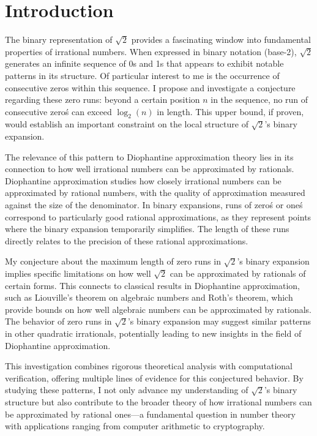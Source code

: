 \section{Introduction}
The binary representation of $\sqrt{2}$ provides a fascinating window into fundamental properties of irrational numbers. When expressed in binary notation (base-2), $\sqrt{2}$ generates an infinite sequence of 0s and 1s that appears to exhibit notable patterns in its structure. Of particular interest to me is the occurrence of consecutive zeros within this sequence. I propose and investigate a conjecture regarding these zero runs: beyond a certain position $n$ in the sequence, no run of consecutive zero\'s can exceed $\log_2(n)$ in length. This upper bound, if proven, would establish an important constraint on the local structure of $\sqrt{2}$'s binary expansion.

The relevance of this pattern to Diophantine approximation theory lies in its connection to how well irrational numbers can be approximated by rationals. Diophantine approximation studies how closely irrational numbers can be approximated by rational numbers, with the quality of approximation measured against the size of the denominator. In binary expansions, runs of zero\'s or one\'s correspond to particularly good rational approximations, as they represent points where the binary expansion temporarily simplifies. The length of these runs directly relates to the precision of these rational approximations.

My conjecture about the maximum length of zero runs in $\sqrt{2}$'s binary expansion implies specific limitations on how well $\sqrt{2}$ can be approximated by rationals of certain forms. This connects to classical results in Diophantine approximation, such as Liouville’s theorem on algebraic numbers and Roth’s theorem, which provide bounds on how well algebraic numbers can be approximated by rationals. The behavior of zero runs in $\sqrt{2}$'s binary expansion may suggest similar patterns in other quadratic irrationals, potentially leading to new insights in the field of Diophantine approximation.

This investigation combines rigorous theoretical analysis with computational verification, offering multiple lines of evidence for this conjectured behavior. By studying these patterns, I not only advance my understanding of $\sqrt{2}$'s binary structure but also contribute to the broader theory of how irrational numbers can be approximated by rational ones—a fundamental question in number theory with applications ranging from computer arithmetic to cryptography.

